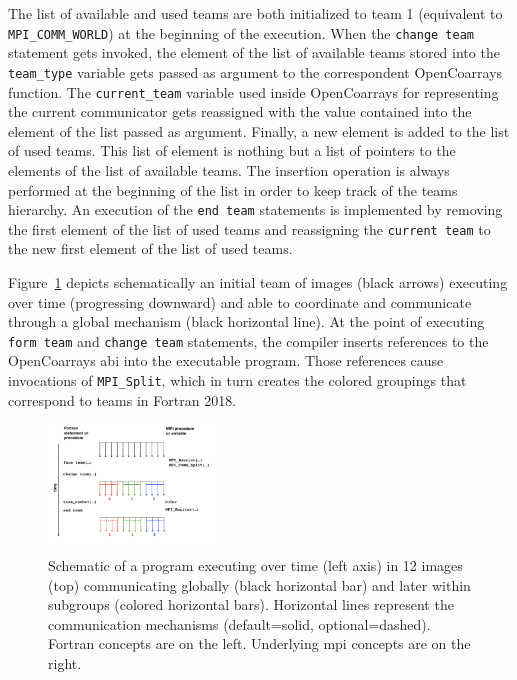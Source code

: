 The list of available and used teams are both initialized to team 1 (equivalent to \texttt{MPI\_COMM\_WORLD}) at the beginning of the execution.
When the \texttt{change team} statement gets invoked, the element of the list of available teams stored into the \texttt{team\_type} variable
gets passed as argument to the correspondent OpenCoarrays function. The \texttt{current\_team} variable used inside OpenCoarrays for
representing the current communicator gets reassigned with the value contained into the element of the list passed as argument.
Finally, a new element is added to the list of used teams. This list of element is nothing but a list of pointers to the elements of the list
of available teams. The insertion operation is always performed at the beginning of the list in order to keep track of the teams hierarchy.
An execution of the \texttt{end team} statements is implemented by removing the first element of the list of used teams and reassigning the
\texttt{current team} to the new first element of the list of used teams.

Figure~\ref{fig:teams} depicts schematically an initial team of images (black arrows) executing over time (progressing
downward) and able to coordinate and communicate through a global mechanism (black horizontal line).  At the point of executing
\texttt{form team} and \texttt{change team} statements, the compiler inserts references to the OpenCoarrays \gls{abi} into the
executable program.  Those references cause invocations of \texttt{MPI\_Split}, which in turn creates the colored groupings that
correspond to teams in Fortran 2018.

\begin{figure}
\includegraphics[width=0.4\textwidth]{figures/teams}
\vspace{-24pt}
\caption{Schematic of a program executing over time
  (left axis) in 12 images (top) communicating globally (black horizontal bar) and later within subgroups (colored horizontal bars).  Horizontal lines represent the communication mechanisms (default=solid, optional=dashed).  Fortran concepts are on the left.  Underlying \gls{mpi} concepts are on the right.\label{fig:teams}}
\end{figure}
%

